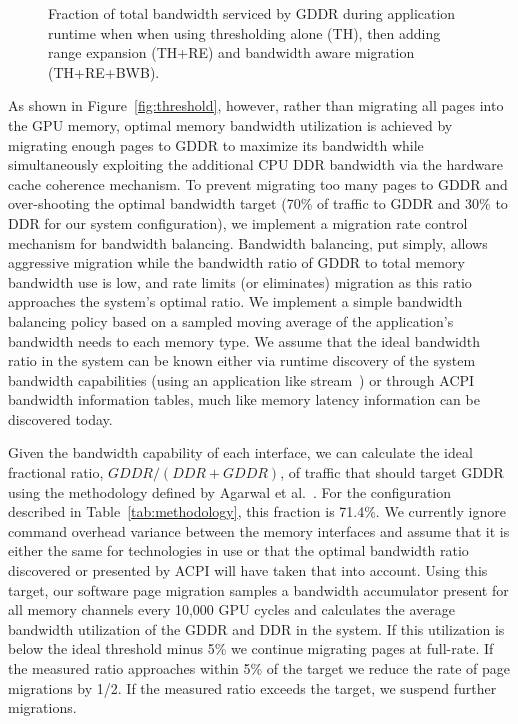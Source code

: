 \begin{figure}[thp]
    \caption{Fraction of total bandwidth serviced by GDDR during application
runtime when when using thresholding alone (TH), then adding range expansion
(TH+RE) and bandwidth aware migration (TH+RE+BWB).}
    \label{fig:migrationlimiting}
\end{figure}

As shown in Figure~\ref{fig:threshold}, however, rather than migrating all pages into the GPU memory,
optimal memory bandwidth utilization is achieved by migrating enough pages to GDDR to maximize its bandwidth while
simultaneously exploiting the additional CPU DDR bandwidth via the hardware cache coherence mechanism.  To prevent
migrating too many pages to GDDR and over-shooting the optimal bandwidth target (70\% of
traffic to GDDR and 30\% to DDR for our system configuration), we implement a migration rate control
mechanism for bandwidth balancing.  Bandwidth balancing, put simply, allows aggressive migration while
the bandwidth ratio of GDDR to total memory bandwidth use is low, and rate limits (or eliminates) migration
as this ratio approaches the system's optimal ratio.
We implement a simple bandwidth balancing policy based on a sampled moving average of the
application's bandwidth needs to each memory type.  We assume that the ideal bandwidth ratio in the system can be known either
via runtime discovery of the system bandwidth capabilities (using an application like stream~\cite{stream_benchmark})
or through ACPI bandwidth information tables, much like memory latency information can be discovered today.

Given the bandwidth capability of each interface, we can calculate the ideal fractional ratio, $GDDR / (DDR + GDDR)$, of traffic that should 
target GDDR using the methodology defined by Agarwal et al.~\cite{Agarwal2015}. For the configuration described in Table~\ref{tab:methodology},
this fraction is 71.4\%.  We currently ignore command overhead
variance between the memory interfaces and assume that it is either the same for technologies in use or that
the optimal bandwidth ratio discovered or presented by ACPI will have taken that into account.  Using this target,
our software page migration samples a bandwidth accumulator present for all memory channels every 10,000 
GPU cycles and calculates the average bandwidth utilization of the GDDR and DDR in the system.  If this utilization
is below the ideal threshold minus 5\% we continue migrating pages at full-rate.  If the measured ratio approaches within 5\% of the target
we reduce the rate of page migrations by 1/2.  If the measured ratio exceeds the target, we suspend further migrations.

